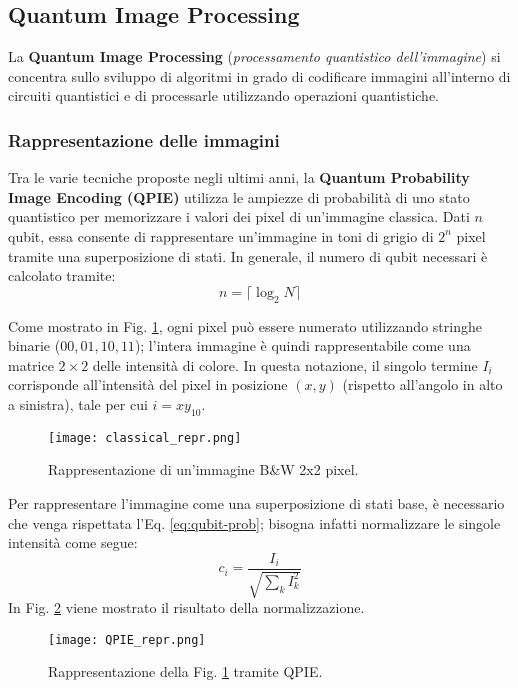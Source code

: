 \subsection{Quantum Image Processing}

La \textbf{Quantum Image Processing} (\emph{processamento quantistico
dell'immagine}) si concentra sullo sviluppo di algoritmi in grado di codificare immagini all’interno di circuiti quantistici e di processarle utilizzando operazioni quantistiche. 

\subsubsection*{Rappresentazione delle immagini}\label{sec:img-rappr} Tra le varie tecniche proposte negli
ultimi anni, la \textbf{Quantum Probability Image Encoding (QPIE)} \cite{qpie} utilizza le ampiezze di probabilità di uno stato quantistico per memorizzare i valori dei pixel di un'immagine classica. Dati $n$ qubit, essa consente di rappresentare un'immagine in toni di grigio di $2^n$ pixel tramite una superposizione di stati. In generale, il numero di qubit necessari è calcolato tramite:
\begin{equation}
	n = \lceil{\log_2{N}}\rceil
	\label{eq:qpie-n-qubit}
\end{equation}

Come mostrato in Fig.
\ref{fig:bw-4x4-img},
ogni pixel può essere numerato utilizzando stringhe binarie ($00,01,10,11$);
l'intera immagine è quindi
rappresentabile come una matrice $2\times2$ delle intensità di colore. In questa
notazione, il singolo termine $I_{i}$ corrisponde all'intensità del pixel in posizione
$(x,y)$ (rispetto all'angolo in alto a sinistra), tale per cui $i = {xy}_{10}$.
\begin{figure}[ht!]
    \centering
    \texttt{[image: classical\_repr.png]}
		\caption{Rappresentazione di un'immagine B\&W 2x2 pixel.}
    \label{fig:bw-4x4-img}
\end{figure}

Per rappresentare l'immagine come una superposizione di stati base, è necessario
che venga rispettata l'Eq. \ref{eq:qubit-prob}; bisogna infatti normalizzare le singole intensità come segue:
\begin{equation}
	c_i = \frac{I_i}{\sqrt{\sum_{k}^{}{I_{k}^2}}}
	\label{eq:intensities-norm}
\end{equation}
In Fig. \ref{fig:bw-4x4-img-qpie}
viene mostrato il risultato della normalizzazione.
\begin{figure}[ht!]
    \centering
    \texttt{[image: QPIE\_repr.png]}
		\caption{Rappresentazione della Fig. \ref{fig:bw-4x4-img} tramite QPIE.}
    \label{fig:bw-4x4-img-qpie}
\end{figure}

